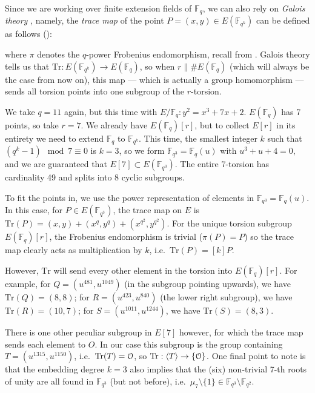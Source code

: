Since we are working over finite extension fields of $\mathbb{F}_q$, we can also rely on \textit{Galois theory} \cite{theory.pairings.for.beginners, }, namely, the \emph{trace map} of the point
$P = (x, y) \in E(\mathbb{F}_{q^k})$ can be defined as follows (): 

where $\pi$ denotes the $q$-power Frobenius endomorphism, recall  from . Galois theory tells us that $\mathrm{Tr} : E(\mathbb{F}_{q^k}) \to E(\mathbb{F}_q)$, so when
$r \| \#E(\mathbb{F}_q)$ (which will always be the case from now on), this
map --- which is actually a group homomorphism --- sends all torsion points
into one subgroup of the $r$-torsion.

\begin{example}[]

We take $q = 11$ again, but this time with $E/\mathbb{F}_q : y^2 = x^3 + 7x + 2$. $E(\mathbb{F}_q)$ has 7 points, so take $r = 7$. We already have $E(\mathbb{F}_q)[r]$, but to collect $E[r]$ in its entirety we need to extend $\mathbb{F}_q$ to $\mathbb{F}_{q^k}$. This time, the smallest integer $k$ such that $(q^k - 1) \mod 7 \equiv 0$ is $k = 3$, so we form $\mathbb{F}_{q^3} = \mathbb{F}_q(u)$ with $u^3 + u + 4 = 0$, and we are guaranteed that $E[7] \subset E(\mathbb{F}_{q^3})$. The entire 7-torsion has cardinality 49 and splits into 8 cyclic subgroups.

To fit the points in, we use the power representation of elements in $\mathbb{F}_{q^3} = \mathbb{F}_q(u)$. In this case, for $P \in E(\mathbb{F}_{q^3})$, the trace map on $E$ is $\text{Tr}(P) = (x, y) + (x^q, y^q) + (x^{q^2}, y^{q^2})$. For the unique torsion subgroup $E(\mathbb{F}_q)[r]$, the Frobenius endomorphism is trivial ($\pi(P) = P$) so the trace map clearly acts as multiplication by $k$, i.e.\ $\text{Tr}(P) = [k]P$. 

However, $\text{Tr}$ will send every other element in the torsion into $E(\mathbb{F}_q)[r]$. For example, for $Q = (u^{481}, u^{1049})$ (in the subgroup pointing upwards), we have $\text{Tr}(Q) = (8, 8)$; for $R = (u^{423}, u^{840})$ (the lower right subgroup), we have $\text{Tr}(R) = (10, 7)$; for $S = (u^{1011}, u^{1244})$, we have $\text{Tr}(S) = (8, 3)$. 

There is one other peculiar subgroup in $E[7]$ however, for which the trace map sends each element to $O$. In our case this subgroup is the group containing $T = (u^{1315}, u^{1150})$, i.e.\ $\text{Tr}(T) = \EuScript{O}$, so $\text{Tr} : \langle T \rangle \to \{\EuScript{O}\}$. One final point to note is that the embedding degree $k = 3$ also implies that the (six) non-trivial 7-th roots of unity are all found in $\mathbb{F}_{q^3}$ (but not before), i.e.\ $\mu_7 \setminus \{1\} \in \mathbb{F}_{q^3} \setminus \mathbb{F}_{q^2}$.

\label{example:413}
\end{example}


